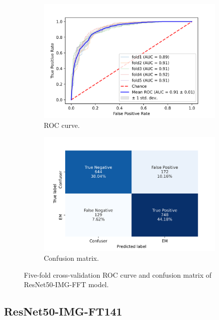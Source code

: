 \begin{figure}[h!]
	\centering
	\begin{subfigure}[b]{0.49\textwidth}
		\centering
		\includegraphics[width=\textwidth,keepaspectratio]{images/Supplement4/image49.png}
		\caption{ROC curve.}
	\end{subfigure}
	\hfill
	\begin{subfigure}[b]{0.49\textwidth}
		\centering
		\includegraphics[width=\textwidth,keepaspectratio]{images/Supplement4/image55.png}
		\caption{Confusion matrix.}
	\end{subfigure}
	\caption{Five-fold cross-validation ROC curve and confusion matrix of ResNet50-IMG-FFT model.}
\end{figure}

\vfill\clearpage
\subsection{ResNet50-IMG-FT141}

